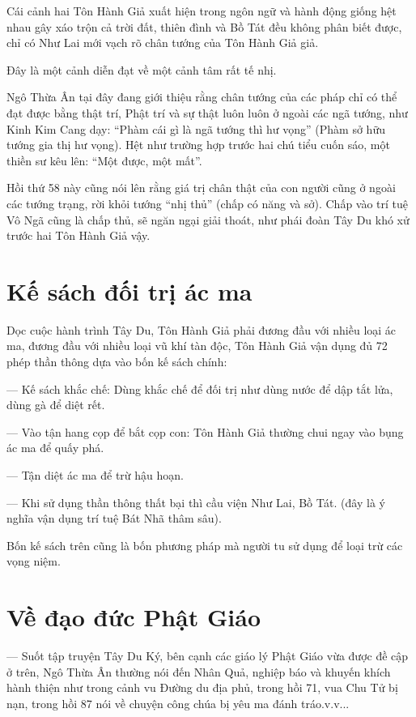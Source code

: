 Cái cảnh hai Tôn Hành Giả xuất hiện trong ngôn ngữ và hành động giống hệt nhau gây xáo trộn cả trời đất, thiên đình và Bồ Tát đều không phân biết được, chỉ có Như Lai mới vạch rõ chân tướng của Tôn Hành Giả giả.

Đây là một cảnh diễn đạt về một cảnh tâm rất tế nhị.

Ngô Thừa Ân tại đây đang giới thiệu rằng chân tướng của các pháp chỉ có thể đạt được bằng thật trí, Phật trí và sự thật luôn luôn ở ngoài các ngã tướng, như Kinh Kim Cang dạy: ``Phàm cái gì là ngã tướng thì hư vọng'' (Phàm sở hữu tướng gia thị hư vọng). Hệt như trường hợp trước hai chú tiểu cuốn sáo, một thiền sư kêu lên: ``Một được, một mất''.

Hồi thứ 58 này cũng nói lên rằng giá trị chân thật của con người cũng ở ngoài các tướng trạng, rời khỏi tướng ``nhị thủ'' (chấp có năng và sở). Chấp vào trí tuệ Vô Ngã cũng là chấp thủ, sẽ ngăn ngại giải thoát, như phái đoàn Tây Du khó xử trước hai Tôn Hành Giả vậy.

\section{Kế sách đối trị ác ma} %
\label{sec:ke_sach_doi_tri_ac_ma}

Dọc cuộc hành trình Tây Du, Tôn Hành Giả phải đương đầu với nhiều loại ác ma, đương đầu với nhiều loại vũ khí tàn độc, Tôn Hành Giả vận dụng đủ 72 phép thần thông dựa vào bốn kế sách chính:

— Kế sách khắc chế: Dùng khắc chế để đối trị như dùng nước để dập tắt lửa, dùng gà để diệt rết.

— Vào tận hang cọp để bắt cọp con: Tôn Hành Giả thường chui ngay vào bụng ác ma để quấy phá.

— Tận diệt ác ma để trừ hậu hoạn.

— Khi sử dụng thần thông thất bại thì cầu viện Như Lai, Bồ Tát. (đây là ý nghĩa vận dụng trí tuệ Bát Nhã thâm sâu).

Bốn kế sách trên cũng là bốn phương pháp mà người tu sử dụng để loại trừ các vọng niệm.

\section{Về đạo đức Phật Giáo} %
\label{sec:ve_dao_duc_Phat_Giao}

— Suốt tập truyện Tây Du Ký, bên cạnh các giáo lý Phật Giáo vừa được đề cập ở trên, Ngô Thừa Ân thường nói đến Nhân Quả, nghiệp báo và khuyến khích hành thiện như trong cảnh vu Đường du địa phủ, trong hồi 71, vua Chu Tử bị nạn, trong hồi 87 nói về chuyện công chúa bị yêu ma đánh tráo.v.v...

